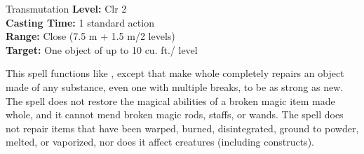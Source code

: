 {Transmutation}
{
	\textbf{Level:}
	Clr 2\\
	\textbf{Casting Time:}
	1 standard action\\
	\textbf{Range:}
	Close (7.5 m + 1.5 m/2 levels)\\
	\textbf{Target:}
	One object of up to 10 cu. ft./ level\\
}
{
	This spell functions like , except that make whole completely repairs an object made of any substance, even one with multiple breaks, to be as strong as new. The spell does not restore the magical abilities of a broken magic item made whole, and it cannot mend broken magic rods, staffs, or wands. The spell does not repair items that have been warped, burned, disintegrated, ground to powder, melted, or vaporized, nor does it affect creatures (including constructs).

}
